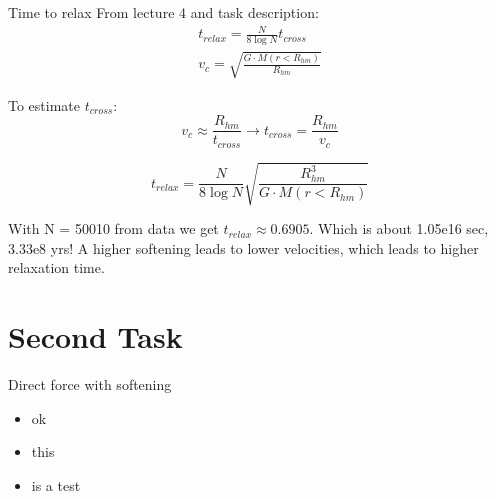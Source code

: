 \documentclass{beamer}
\begin{document}
\begin{frame}{Time to relax}
	From lecture 4 and task description:
	\begin{eqnarray}
		t_{relax} = \frac{N}{8 \log{N}} t_{cross} \\
		v_c = \sqrt{\frac{G \cdot M(r < R_{hm})}{R_{hm}}}
	\end{eqnarray}

	
	To estimate $t_{cross}$:
	\begin{equation}
		v_c \approx \frac{R_{hm}}{t_{cross}} \rightarrow t_{cross} = \frac{R_{hm}}{v_{c}}
	\end{equation}
	
	
	
	\begin{equation}
		t_{relax}  = \frac{N}{8 \log N} \sqrt{\frac{R_{hm}^3}{G \cdot M(r < R_{hm})}}
	\end{equation}
	
	With N = 50010 from data we get $t_{relax} \approx 0.6905$.
	 Which is about 1.05e16 sec, 3.33e8 yrs! A higher softening leads to lower velocities, which leads to higher relaxation time.
	
	\end{frame}



\section{Second Task}
\begin{frame}{Direct force with softening}
	\begin{itemize}
		\item ok
		\item this
		\item is a test
	\end{itemize}
\end{frame}
\end{document}
